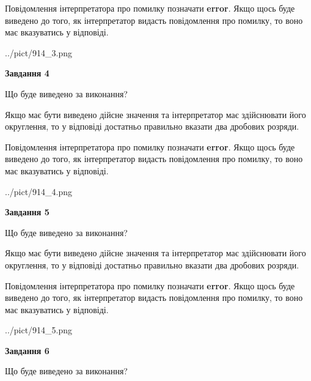 \documentclass[12pt, ukrainian]{article}
\begin{document}
{\begin {Large}
Повідомлення інтерпретатора про помилку позначати \textbf{error}.
Якщо щось буде виведено до того, як інтерпретатор видасть повідомлення про помилку, 
то воно має вказуватись у відповіді. \par

\begin{center}
	{../pict/914_3.png}
\end{center}
\newpage

{\begin {center}\textbf{Завдання 4}\end {center}}\par
Що буде виведено за виконання? \par

Якщо має бути виведено дійсне значення та інтерпретатор має здійснювати його округлення, 
то у відповіді достатньо правильно вказати два дробових розряди.

Повідомлення інтерпретатора про помилку позначати \textbf{error}.
Якщо щось буде виведено до того, як інтерпретатор видасть повідомлення про помилку, 
то воно має вказуватись у відповіді. \par

\begin{center}
	{../pict/914_4.png}
\end{center}
\newpage

{\begin {center}\textbf{Завдання 5}\end {center}}\par
Що буде виведено за виконання? \par

Якщо має бути виведено дійсне значення та інтерпретатор має здійснювати його округлення, 
то у відповіді достатньо правильно вказати два дробових розряди.

Повідомлення інтерпретатора про помилку позначати \textbf{error}.
Якщо щось буде виведено до того, як інтерпретатор видасть повідомлення про помилку, 
то воно має вказуватись у відповіді. \par

\begin{center}
	{../pict/914_5.png}
\end{center}
\newpage

{\begin {center}\textbf{Завдання 6}\end {center}}\par
Що буде виведено за виконання? \par


\end{Large}}
\end{document}
